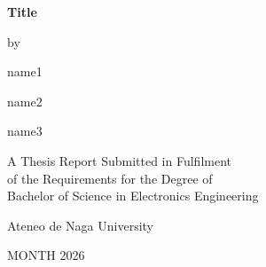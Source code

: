\thispagestyle{empty} %
\begin{center}
	\begingroup
	\fontsize{12}{14.5}\selectfont %
	\setlength{\parskip}{0pt}
	\setlength{\parindent}{0pt}
	
	\vspace*{5\baselineskip}
	
	{\bfseries\fontsize{20}{24}\selectfont 
		Title\par}
	
	\vspace{8\baselineskip}
	{\fontsize{14}{17}\selectfont by\par}
	\vspace{1\baselineskip} 
	
	
	{\fontsize{14}{17}\selectfont 
		name1\par
		name2\par
		name3\par}
	\vspace{7\baselineskip} 

	{\fontsize{14}{17}\selectfont
		A Thesis Report Submitted in Fulfilment\\
		of the Requirements for the Degree of\\
		Bachelor of Science in Electronics Engineering\par}	
	\vspace{7\baselineskip} 
	
	{\fontsize{14}{17}\selectfont
		Ateneo de Naga University\par
		MONTH 2026\par}
	\endgroup
\end{center}
